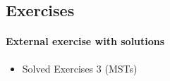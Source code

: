 


\subsection{Exercises}

\paragraph{External exercise with solutions}
\begin{itemize}
\item \KT Solved Exercises 3 (MSTs)
\end{itemize}

